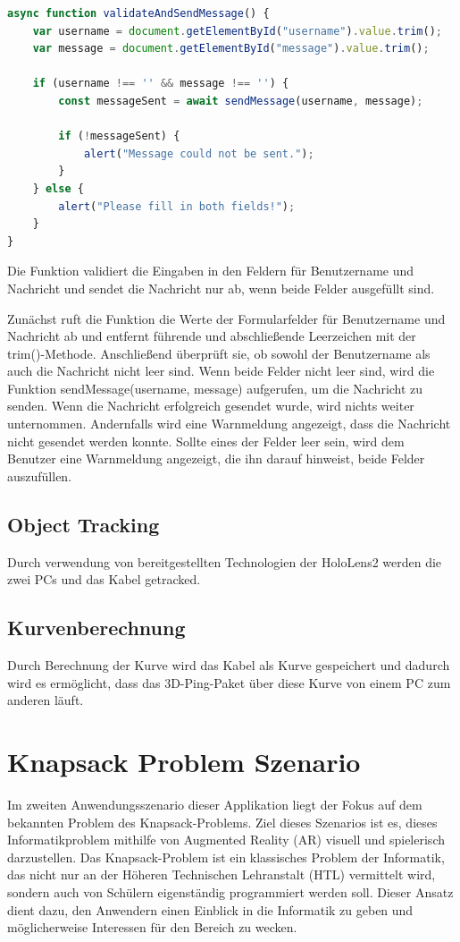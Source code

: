 \begin{lstlisting}[language=JavaScript, caption={Javascript | Validierung und Senden der Message}]
async function validateAndSendMessage() {
    var username = document.getElementById("username").value.trim();
    var message = document.getElementById("message").value.trim();

    if (username !== '' && message !== '') {
        const messageSent = await sendMessage(username, message);

        if (!messageSent) {
            alert("Message could not be sent.");
        }
    } else {
        alert("Please fill in both fields!");
    }
}
\end{lstlisting}

Die Funktion validiert die Eingaben in den Feldern für Benutzername und Nachricht und sendet die Nachricht nur ab, wenn
beide Felder ausgefüllt sind.

Zunächst ruft die Funktion die Werte der Formularfelder für Benutzername und Nachricht ab und entfernt führende und
abschließende Leerzeichen mit der trim()-Methode. Anschließend überprüft sie, ob sowohl der Benutzername als auch die
Nachricht nicht leer sind. Wenn beide Felder nicht leer sind, wird die Funktion sendMessage(username, message) aufgerufen,
um die Nachricht zu senden. Wenn die Nachricht erfolgreich gesendet wurde, wird nichts weiter unternommen. Andernfalls wird
eine Warnmeldung angezeigt, dass die Nachricht nicht gesendet werden konnte. Sollte eines der Felder leer sein, wird dem
Benutzer eine Warnmeldung angezeigt, die ihn darauf hinweist, beide Felder auszufüllen.

\subsection{Object Tracking}
Durch verwendung von bereitgestellten Technologien der HoloLens2
werden die zwei PCs und das Kabel getracked.

\subsection{Kurvenberechnung}
Durch Berechnung der Kurve wird das Kabel als Kurve gespeichert
und dadurch wird es ermöglicht, dass das 3D-Ping-Paket über diese
Kurve von einem PC zum anderen läuft.

\section{Knapsack Problem Szenario}
Im zweiten Anwendungsszenario dieser Applikation liegt der Fokus auf dem bekannten Problem des Knapsack-Problems. Ziel
dieses Szenarios ist es, dieses Informatikproblem mithilfe von Augmented Reality (AR) visuell und spielerisch darzustellen.
Das Knapsack-Problem ist ein klassisches Problem der Informatik, das nicht nur an der Höheren Technischen Lehranstalt (HTL)
vermittelt wird, sondern auch von Schülern eigenständig programmiert werden soll. Dieser Ansatz dient dazu, den Anwendern
einen Einblick in die Informatik zu geben und möglicherweise Interessen für den Bereich zu wecken.

